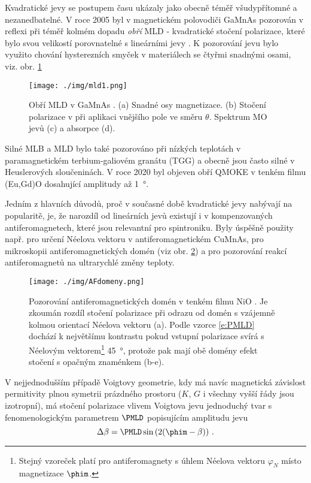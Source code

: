Kvadratické jevy se postupem času ukázaly jako obecně téměř všudypřítomné a nezanedbatelné.
V roce 2005 byl v magnetickém polovodiči GaMnAs pozorován v reflexi při téměř kolmém dopadu \emph{obří} MLD - kvadratické stočení polarizace, které bylo svou velikostí porovnatelné s lineárními jevy  \cite{pozor2}.
K pozorování jevu bylo využito chování hysterezních smyček v materiálech se čtyřmi snadnými osami, viz. obr. \ref{f:giant mld}

\begin{figure}
    \centering
    \texttt{[image: ./img/mld1.png]}
    \caption{Obří MLD v GaMnAs \cite{pozor2}. (a) Snadné osy magnetizace. (b) Stočení polarizace v při aplikaci vnějšího pole ve směru $\theta$. Spektrum MO jevů (c) a absorpce (d).}
    \label{f:giant mld}
\end{figure}

Silné MLB a MLD bylo také pozorováno při nízkých teplotách v paramagnetickém terbium-galiovém granátu (TGG)\cite{pozor3} a obecně jsou často silné v Heuslerových sloučeninách\cite{Heusler}.
V roce 2020 byl objeven obří QMOKE v tenkém filmu (Eu,Gd)O dosahující amplitudy až \SI{1}{\degree}.

Jedním z hlavních důvodů, proč v současné době kvadratické jevy nabývají na popularitě, je, že narozdíl od lineárních jevů existují i v kompenzovaných antiferomagnetech, které jsou relevantní pro spintroniku\cite{Jungwirthantifero}\cite{Nemecantifero}.
Byly úspěšně použity např. pro určení Néelova vektoru v antiferomagnetickém CuMnAs\cite{SaidlOpticalNeel}, pro mikroskopii antiferomagnetických domén\cite{antifdomeny} (viz obr. \ref{f:AFdomeny}) a pro pozorování reakcí antiferomagnetů na ultrarychlé změny teploty\cite{antifteploty}.

\begin{figure}
    \centering
    \texttt{[image: ./img/AFdomeny.png]}
    \caption{Pozorování antiferomagnetických domén v tenkém filmu NiO \cite{antifdomeny}. Je zkoumán rozdíl stočení polarizace při odrazu od domén s vzájemně kolmou orientací Néelova vektoru (a). Podle vzorce \eqref{e:PMLD} dochází k největšímu kontrastu pokud vstupní polarizace svírá s Néelovým vektorem\footnote{Stejný vzoreček platí pro antiferomagnety s úhlem Néelova vektoru $\varphi_N$ místo magnetizace $\phim$.} \SI{45}{\degree}, protože pak mají obě domény efekt stočení s opačným znaménkem (b-e).}
    \label{f:AFdomeny}
\end{figure}

V nejjednodušším případě Voigtovy geometrie, kdy má navíc magnetická závislost permitivity plnou symetrii prázdného prostoru ($K$, $G$ i všechny vyšší řády jsou izotropní), má stočení polarizace vlivem Voigtova jevu jednoduchý tvar s fenomenologickým parametrem $\PMLD$ popisujícím amplitudu jevu
\begin{equation} \label{e:PMLD}
\Delta \beta=\PMLD \sin\left(2(\phim-\beta)\right) \,.
\end{equation}

